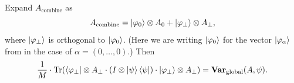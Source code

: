 \begin{lemma}\label{lem:global-rewrite}
Expand $A_{\mathrm{combine}}$ as
\begin{equation*}
A_{\mathrm{combine}} = \ket{\varphi_0} \otimes A_0 + \ket{\varphi_{\perp}} \otimes A_{\perp},
\end{equation*}
where $\ket{\varphi_{\perp}}$ is orthogonal to $\ket{\varphi_0}$.
(Here we are writing $\ket{\varphi_0}$ for the vector $\ket{\varphi_\alpha}$ from  in the case of $\alpha = (0, \ldots, 0)$.)
Then
\begin{equation*}
\frac{1}{M} \cdot \mathrm{Tr}(\bra{\varphi_{\perp}} \otimes A_{\perp} \cdot (I \otimes \ket{\psi}\bra{\psi}) \cdot \ket{\varphi_{\perp}} \otimes A_{\perp})= \mathbf{Var}_{\mathrm{global}}(A, \psi).
\end{equation*}
\end{lemma}
